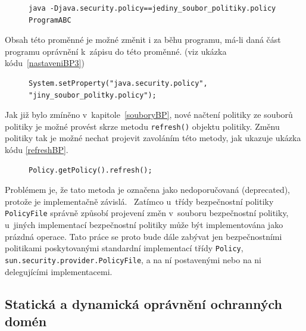 \begin{figure}[t]
\begin{lstlisting}[caption=Spuštění JVM jen s~vlastním souborem bezpečnostní politiky, label=nastaveniBP2]
java -Djava.security.policy==jediny_soubor_politiky.policy ProgramABC
\end{lstlisting}
\end{figure}

Obsah této proměnné je možné změnit i za běhu programu, má-li daná část programu oprávnění k~zápisu do této proměnné. (viz ukázka kódu~\ref{nastaveniBP3})

\begin{figure}[tbh]
\begin{lstlisting}[caption=Nastavení souboru bezpečnostní politiky zevnitř JVM, label=nastaveniBP3]
System.setProperty("java.security.policy", "jiny_soubor_politky.policy");
\end{lstlisting}
\end{figure}

Jak již bylo zmíněno v~kapitole~\ref{souboryBP}, nové načtení politiky ze souborů politiky je možné provést skrze metodu {\tt refresh()} objektu politiky.
Změnu politiky tak je možné nechat projevit zavoláním této metody, jak ukazuje ukázka kódu \ref{refreshBP}.

\begin{figure}[tbh]
\begin{lstlisting}[caption=Znovunačtení souboru bezpečnostní politiky, label=refreshBP]
Policy.getPolicy().refresh();
\end{lstlisting}
\end{figure}

Problémem je, že tato metoda je označena jako nedoporučovaná (deprecated), protože je implementačně závislá.~\cite{refPolicy}
Zatímco u~třídy bezpečnostní politiky {\tt PolicyFile} správně způsobí projevení změn v~souboru bezpečnostní politiky, u~jiných implementací bezpečnostní politiky může být implementována jako prázdná operace.
Tato práce se proto bude dále zabývat jen bezpečnostními politikami poskytovanými standardní implementací třídy {\tt Policy}, {\tt sun.security.provider.PolicyFile}, a na ní postavenými nebo na ni delegujícími implementacemi.

\subsection{Statická a dynamická oprávnění ochranných domén} \label{staticPerm}

